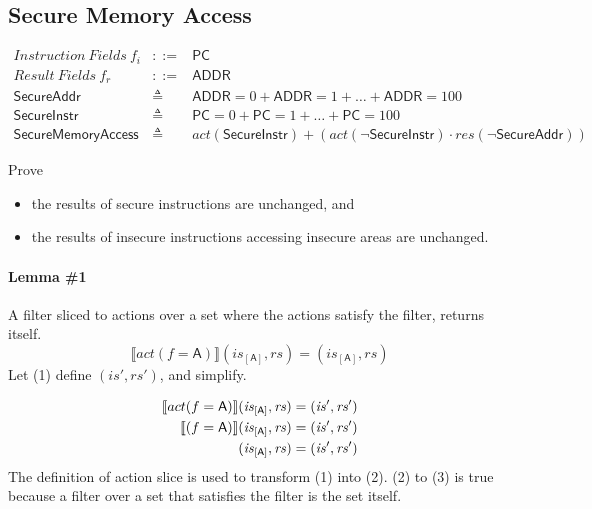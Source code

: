 \documentclass[12pt, letterpaper]{article}
\newcommand\interp[1]{\llbracket #1 \rrbracket}
\begin{document}
\subsection{Secure Memory Access}
 \[
 \begin{array}{rcl}
   \mathit{Instruction\ Fields}\ f_i &::=& \mathsf{PC} \\
   \mathit{Result\ Fields}\ f_r &::=& \mathsf{ADDR} \\
   \mathsf{SecureAddr} &\triangleq& \mathsf{ADDR} = 0 + \mathsf{ADDR} = 1 + \ldots + \mathsf{ADDR} = 100 \\
   \mathsf{SecureInstr} &\triangleq& \mathsf{PC} = 0 + \mathsf{PC} = 1 + \ldots + \mathsf{PC} = 100 \\
   \mathsf{SecureMemoryAccess} &\triangleq&
     \mathit{act}(\mathsf{SecureInstr}) +
     (\mathit{act}(\neg\mathsf{SecureInstr}) \cdot
      \mathit{res}(\neg\mathsf{SecureAddr}))
      
 \end{array}
 \]

 Prove
 \begin{itemize}
     \item the results of secure instructions are unchanged, and
     \item the results of insecure instructions accessing insecure areas are unchanged.
 \end{itemize}

 \paragraph{Lemma \#1}
     A filter sliced to actions over a set where the actions satisfy the filter, returns itself.
 \[
     \interp{ act(f=\mathsf{A}) } (\mathit{is}_{[\mathsf{A}]}, \mathit{rs}) = (\mathit{is_{[\mathsf{A}]}}, \mathit{rs})
 \]
     Let (1) define $(\mathit{is}', \mathit{rs}')$, and simplify.
 \par\nobreak
 {\small
 \begin{align}
     \setcounter{equation}{0}
     \interp{ act(f=\mathsf{A}) } (\mathit{is}_{[\mathsf{A}]}, \mathit{rs})
     &= 
     (\mathit{is}', \mathit{rs}')
     \\
     \interp{ (f=\mathsf{A}) } (\mathit{is}_{[\mathsf{A}]}, \mathit{rs})
     &= 
     (\mathit{is}', \mathit{rs}')
     \\
     (\mathit{is}_{[\mathsf{A}]}, \mathit{rs})
     &= 
     (\mathit{is}', \mathit{rs}')
 \end{align}
 }
     The definition of action slice is used to transform (1) into (2).  (2) to (3) is true because a filter over a set that satisfies the filter is the set itself.\\
\end{document}
